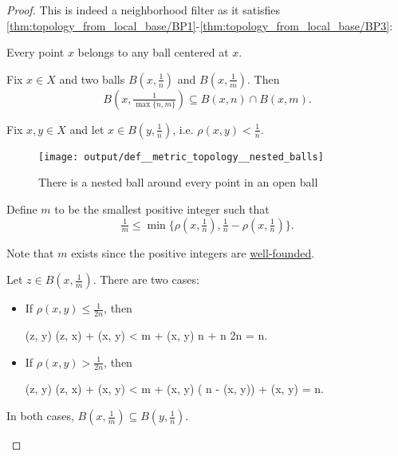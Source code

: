\begin{proof}
  This is indeed a neighborhood filter as it satisfies \ref{thm:topology_from_local_base/BP1}-\ref{thm:topology_from_local_base/BP3}:

  \begin{refenum}
     Every point \( x \) belongs to any ball centered at \( x \).

     Fix \( x \in X \) and two balls \( B(x, \tfrac 1 n) \) and \( B(x, \tfrac 1 m) \). Then
    \begin{equation*}
      B(x, \tfrac 1 {\max\{ n, m \}}) \subseteq B(x, n) \cap B(x, m).
    \end{equation*}

     Fix \( x, y \in X \) and let \( x \in B(y, \tfrac 1 n) \), i.e. \( \rho(x, y) < \tfrac 1 n \).

    \begin{figure}[!ht]
      \centering
      \texttt{[image: output/def\_\_metric\_topology\_\_nested\_balls]}
      \caption{There is a nested ball around every point in an open ball}\label{def:metric_topology/nested_balls}
    \end{figure}

    Define \( m \) to be the smallest positive integer such that
    \begin{equation*}
      \tfrac 1 m \leq \min\{ \rho(x, \tfrac 1 n), \tfrac 1 n - \rho(x, \tfrac 1 n) \}.
    \end{equation*}

    Note that \( m \) exists since the positive integers are \hyperref[def:well_founded_relation]{well-founded}.

    Let \( z \in B(x, \tfrac 1 m) \). There are two cases:
    \begin{itemize}
      \item If \( \rho(x, y) \leq \tfrac 1 {2n} \), then
            \begin{balign*}
              \rho(z, y)
              \leq
              \rho(z, x) + \rho(x, y)
              <
               m + \rho(x, y)
              \leq
               n +  n
                {2n}
              =
               n.
            \end{balign*}

      \item If \( \rho(x, y) > \tfrac 1 {2n} \), then
            \begin{balign*}
              \rho(z, y)
              \leq
              \rho(z, x) + \rho(x, y)
              <
               m + \rho(x, y)
              \leq
              ( n - \rho(x, y)) + \rho(x, y)
              =
               n.
            \end{balign*}
    \end{itemize}

    In both cases, \( B(x, \tfrac 1 m) \subseteq B(y, \tfrac 1 n) \).
  \end{refenum}
\end{proof}

